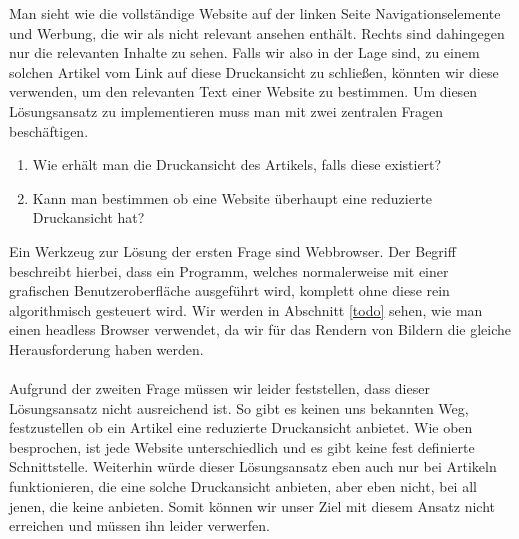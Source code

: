 Man sieht wie die vollständige Website auf der linken Seite Navigationselemente und Werbung, die wir als nicht relevant ansehen enthält. Rechts sind dahingegen nur die relevanten Inhalte zu sehen. Falls wir also in der Lage sind, zu einem solchen Artikel vom Link auf diese Druckansicht zu schließen, könnten wir diese verwenden, um den relevanten Text einer Website zu bestimmen. Um diesen Lösungsansatz zu implementieren muss man mit zwei zentralen Fragen beschäftigen.
\begin{enumerate}
	\item Wie erhält man die Druckansicht des Artikels, falls diese existiert?
	\item Kann man bestimmen ob eine Website überhaupt eine reduzierte Druckansicht hat? 
\end{enumerate}
Ein Werkzeug zur Lösung der ersten Frage sind  Webbrowser. Der Begriff  beschreibt hierbei, dass ein Programm, welches normalerweise mit einer grafischen Benutzeroberfläche ausgeführt wird, komplett ohne diese rein algorithmisch gesteuert wird. Wir werden in Abschnitt \ref{todo} sehen, wie man einen headless Browser verwendet, da wir für das Rendern von Bildern die gleiche Herausforderung haben werden. \\ \\
Aufgrund der zweiten Frage müssen wir leider feststellen, dass dieser Lösungsansatz nicht ausreichend ist. So gibt es keinen uns bekannten Weg, festzustellen ob ein Artikel eine reduzierte Druckansicht anbietet. Wie oben besprochen, ist jede Website unterschiedlich und es gibt keine fest definierte Schnittstelle. Weiterhin würde dieser Lösungsansatz eben auch nur bei Artikeln funktionieren, die eine solche Druckansicht anbieten, aber eben nicht, bei all jenen, die keine anbieten. Somit können wir unser Ziel mit diesem Ansatz nicht erreichen und müssen ihn leider verwerfen.


